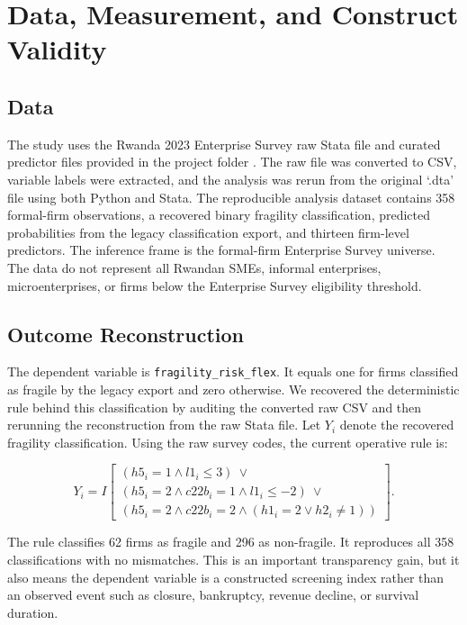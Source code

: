 \section{Data, Measurement, and Construct Validity}

\subsection{Data}

The study uses the Rwanda 2023 Enterprise Survey raw Stata file and curated predictor files provided in the project folder \citep{worldbank2025rwanda}. The raw file was converted to CSV, variable labels were extracted, and the analysis was rerun from the original `.dta' file using both Python and Stata. The reproducible analysis dataset contains 358 formal-firm observations, a recovered binary fragility classification, predicted probabilities from the legacy classification export, and thirteen firm-level predictors. The inference frame is the formal-firm Enterprise Survey universe. The data do not represent all Rwandan SMEs, informal enterprises, microenterprises, or firms below the Enterprise Survey eligibility threshold.

\subsection{Outcome Reconstruction}

The dependent variable is \texttt{fragility\_risk\_flex}. It equals one for firms classified as fragile by the legacy export and zero otherwise. We recovered the deterministic rule behind this classification by auditing the converted raw CSV and then rerunning the reconstruction from the raw Stata file. Let $Y_i$ denote the recovered fragility classification. Using the raw survey codes, the current operative rule is:

\begin{equation}
Y_i =
I
\left[
\begin{array}{l}
(h5_i = 1 \land l1_i \leq 3) \ \lor \\
(h5_i = 2 \land c22b_i = 1 \land l1_i \leq -2) \ \lor \\
(h5_i = 2 \land c22b_i = 2 \land (h1_i = 2 \lor h2_i \neq 1))
\end{array}
\right].
\end{equation}

The rule classifies 62 firms as fragile and 296 as non-fragile. It reproduces all 358 classifications with no mismatches. This is an important transparency gain, but it also means the dependent variable is a constructed screening index rather than an observed event such as closure, bankruptcy, revenue decline, or survival duration.

